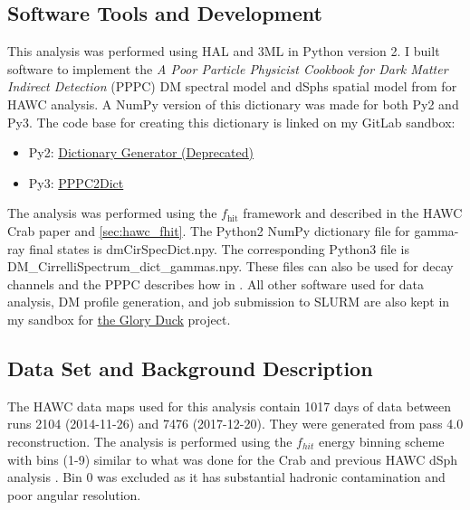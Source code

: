 \subsection{Software Tools and Development}\label{sec:gd_tools}

This analysis was performed using HAL and 3ML \cite{Abeysekara_2017, vianello2015multimission} in Python version 2.
I built software to implement the \emph{A Poor Particle Physicist Cookbook for Dark Matter Indirect Detection} (PPPC) \cite{Cirelli_2011} DM spectral model and dSphs spatial model from \cite{Geringer_Sameth_2015} for HAWC analysis.
A NumPy version of this dictionary was made for both Py2 and Py3.
The code base for creating this dictionary is linked on my GitLab sandbox:

\begin{itemize}
    \item Py2: \href{https://gitlab.com/hawc-observatory/sandboxes/salaza82/glory-duck-hawc/-/tree/master/GD_spectrum}{Dictionary Generator (Deprecated)}
    \item Py3: \href{https://gitlab.com/hawc-observatory/sandboxes/salaza82/pppc2dict}{PPPC2Dict}
\end{itemize}

The analysis was performed using the $f_{\textrm{hit}}$ framework and described in the HAWC Crab paper \cite{Abeysekara_2017} and \cref{sec:hawc_fhit}.
The Python2 NumPy dictionary file for gamma-ray final states is dmCirSpecDict.npy.
The corresponding Python3 file is DM\_CirrelliSpectrum\_dict\_gammas.npy.
These files can also be used for decay channels and the PPPC describes how in \cite{Cirelli_2011}.
All other software used for data analysis, DM profile generation, and job submission to SLURM are also kept in my sandbox for \href{https://gitlab.com/hawc-observatory/sandboxes/salaza82/glory-duck-hawc}{the Glory Duck} project.

\subsection{Data Set and Background Description} \label{sec:gs_data_bkgd}

The HAWC data maps used for this analysis contain 1017 days of data between runs 2104 (2014-11-26) and 7476 (2017-12-20).
They were generated from pass 4.0 reconstruction.
The analysis is performed using the $f_{hit}$ energy binning scheme with bins (1-9) similar to what was done for the Crab and previous HAWC dSph analysis \cite{Abeysekara_2017,Albert_2018}.
Bin 0 was excluded as it has substantial hadronic contamination and poor angular resolution.

